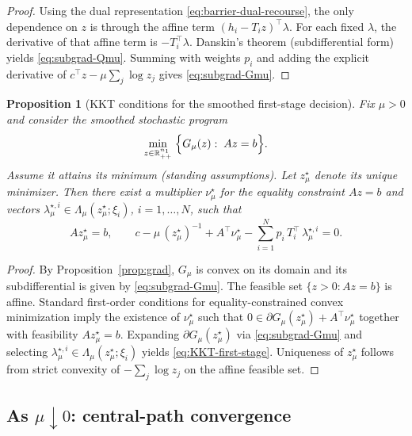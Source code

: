 \documentclass[11pt]{article}
\theoremstyle{plain}
\newtheorem{proposition}[theorem]{Proposition}
\theoremstyle{definition}
\theoremstyle{remark}
\begin{document}
\begin{proof}
Using the dual representation \eqref{eq:barrier-dual-recourse}, the only dependence on $z$ is through
the affine term $(h_i-T_i z)^\top\lambda$. For each fixed $\lambda$, the derivative of that affine term is
$-T_i^\top\lambda$. Danskin's theorem (subdifferential form) yields \eqref{eq:subgrad-Qmu}. Summing with
weights $p_i$ and adding the explicit derivative of $c^\top z-\mu\sum_j\log z_j$ gives \eqref{eq:subgrad-Gmu}.
\end{proof}

\begin{proposition}[KKT conditions for the smoothed first-stage decision]\label{prop:first-stage-KKT}
Fix $\mu>0$ and consider the smoothed stochastic program
\begin{equation}\label{eq:stoch-mu}
\min_{z\in\mathbb{R}^{n_1}_{++}}\;\Bigl\{G_\mu(z):\;Az=b\Bigr\}.
\end{equation}
Assume it attains its minimum (standing assumptions). Let $z_\mu^\star$ denote its unique minimizer.
Then there exist a multiplier $\nu_\mu^\star$ for the equality constraint $Az=b$ and vectors
$\lambda_{\mu}^{\star,i}\in\Lambda_\mu(z_\mu^\star;\xi_i)$, $i=1,\dots,N$, such that
\begin{equation}\label{eq:KKT-first-stage}
Az_\mu^\star=b,\qquad
c-\mu\,(z_\mu^\star)^{-1}+A^\top\nu_\mu^\star-\sum_{i=1}^N p_i\,T_i^\top\,\lambda_{\mu}^{\star,i}=0.
\end{equation}
\end{proposition}

\begin{proof}
By Proposition~\ref{prop:grad}, $G_\mu$ is convex on its domain and its subdifferential is given by
\eqref{eq:subgrad-Gmu}. The feasible set $\{z>0:Az=b\}$ is affine. Standard first-order conditions for
equality-constrained convex minimization imply the existence of $\nu_\mu^\star$ such that
$0\in\partial G_\mu(z_\mu^\star)+A^\top\nu_\mu^\star$ together with feasibility $Az_\mu^\star=b$.
Expanding $\partial G_\mu(z_\mu^\star)$ via \eqref{eq:subgrad-Gmu} and selecting
$\lambda_{\mu}^{\star,i}\in\Lambda_\mu(z_\mu^\star;\xi_i)$ yields \eqref{eq:KKT-first-stage}.
Uniqueness of $z_\mu^\star$ follows from strict convexity of $-\sum_j\log z_j$ on the affine feasible set.
\end{proof}

\subsection[As mu to 0: central-path convergence]{As $\mu\downarrow 0$: central-path convergence}\label{subsec:barrier:convergence}
\end{document}
